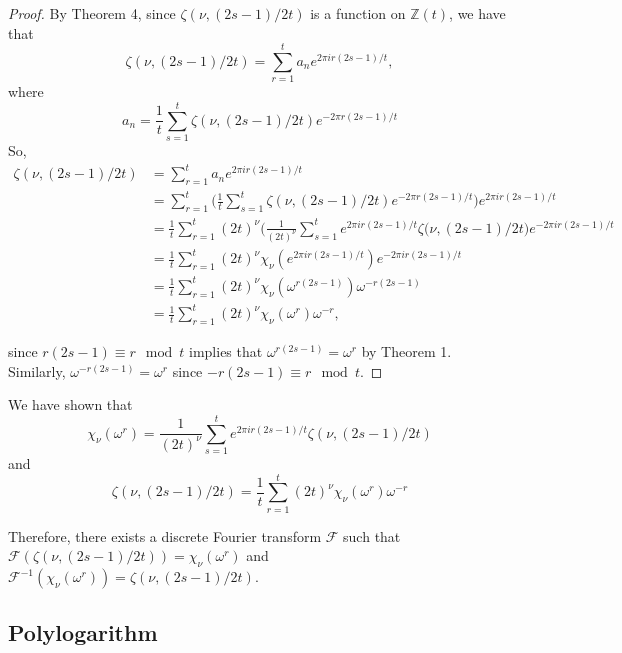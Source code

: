 \documentclass[../article.tex]{subfiles}
\begin{document}
\begin{proof}
By Theorem 4, since $\zeta(\nu, (2s-1)/2t)$ is a function on $\mathbb{Z}(t)$, we have that
\begin{equation}
\zeta(\nu, (2s-1)/2t) = \sum_{r=1}^{t} a_{n} e^{2 \pi i r(2s-1)/t},
\end{equation}
where
\begin{equation}
a_n = \frac{1}{t} \sum_{s=1}^{t} \zeta(\nu, (2s-1)/2t) e^{-2 \pi r(2s-1)/t}
\end{equation}
So,
\begin{equation}
\begin{split}
\zeta(\nu, (2s-1)/2t) &= \sum_{r=1}^{t} a_{n} e^{2 \pi i r(2s-1)/t} \\
&= \sum_{r=1}^{t} \Bigg(\frac{1}{t} \sum_{s=1}^{t} \zeta(\nu, (2s-1)/2t) e^{-2 \pi r(2s-1)/t}\Bigg)e^{2 \pi i r(2s-1)/t} \\
&= \frac{1}{t} \sum_{r=1}^{t} (2t)^{\nu} \Bigg(\frac{1}{(2t)^{\nu}} \sum_{s=1}^{t} e^{2 \pi ir(2s-1)/t} \zeta(\nu, (2s-1)/2t \Bigg) e^{-2 \pi ir(2s-1)/t} \\
&= \frac{1}{t} \sum_{r=1}^{t} (2t)^{\nu} \chi_{\nu}(e^{2 \pi ir(2s-1)/t})e^{-2 \pi ir(2s-1)/t} \\
&= \frac{1}{t} \sum_{r=1}^{t} (2t)^{\nu} \chi_{\nu}(\omega^{r(2s-1)})\omega^{-r(2s-1)} \\
&= \frac{1}{t} \sum_{r=1}^{t} (2t)^{\nu} \chi_{\nu}(\omega^{r})\omega^{-r},
\end{split}
\end{equation}

since $r(2s-1) \equiv r \mod t$ implies that $\omega^{r(2s-1)} = \omega^{r}$ by Theorem 1. Similarly, $\omega^{-r(2s-1)} = \omega^{r}$ since $-r(2s-1) \equiv r \mod t$.
\end{proof}

We have shown that
\begin{equation}
\chi_{\nu}(\omega^r) = \frac{1}{(2t)^{\nu}} \sum_{s=1}^{t} e^{2 \pi ir(2s-1)/t} \zeta(\nu, (2s-1)/2t)
\end{equation}
and
\begin{equation}
\zeta(\nu, (2s-1)/2t) = \frac{1}{t} \sum_{r=1}^{t} (2t)^{\nu} \chi_{\nu}(\omega^{r})\omega^{-r}
\end{equation}

Therefore, there exists a discrete Fourier transform $\mathcal{F}$ such that $\mathcal{F}(\zeta(\nu, (2s-1)/2t)) = \chi_{\nu}(\omega^r)$ and $\mathcal{F}^{-1}(\chi_{\nu}(\omega^r)) = \zeta(\nu, (2s-1)/2t)$.

\subsection{Polylogarithm}
\end{document}
